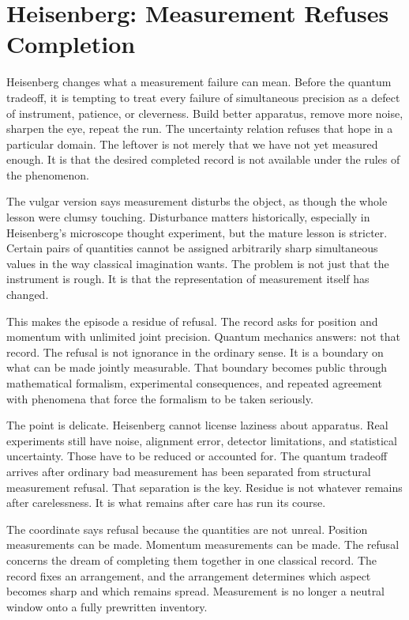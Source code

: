 \section{Heisenberg: Measurement Refuses Completion}

Heisenberg changes what a measurement failure can mean. Before the quantum
tradeoff, it is tempting to treat every failure of simultaneous precision as a
defect of instrument, patience, or cleverness.
Build better apparatus, remove more noise, sharpen the eye, repeat the run.
The uncertainty relation refuses that hope in a particular domain. The
leftover is not merely that we have not yet measured enough. It is that the
desired completed record is not available under the rules of the phenomenon.

The vulgar version says measurement disturbs the object, as though the whole
lesson were clumsy touching. Disturbance matters historically, especially in
Heisenberg's microscope thought experiment, but the mature lesson is stricter.
Certain pairs of quantities cannot be assigned arbitrarily sharp simultaneous
values in the way classical imagination wants. The problem is not just that
the instrument is rough. It is that the representation of measurement itself
has changed.

This makes the episode a residue of refusal. The record asks for position and
momentum with unlimited joint precision. Quantum mechanics answers: not that
record. The refusal is not ignorance in the ordinary sense. It is a boundary
on what can be made jointly measurable. That boundary becomes public through
mathematical formalism, experimental consequences, and repeated agreement with
phenomena that force the formalism to be taken seriously.

The point is delicate. Heisenberg cannot license laziness about apparatus.
Real experiments still have noise, alignment error, detector limitations, and
statistical uncertainty. Those have to be reduced or accounted for. The
quantum tradeoff arrives after ordinary bad measurement has been separated
from structural measurement refusal. That separation is the key. Residue is
not whatever remains after carelessness. It is what remains after care has
run its course.

The coordinate says  refusal because the quantities are not
unreal. Position measurements can be made. Momentum measurements can be made.
The refusal concerns the dream of completing them together in one classical
record. The record fixes an arrangement, and the arrangement determines
which aspect becomes sharp and which remains spread. Measurement is no longer
a neutral window onto a fully prewritten inventory.

